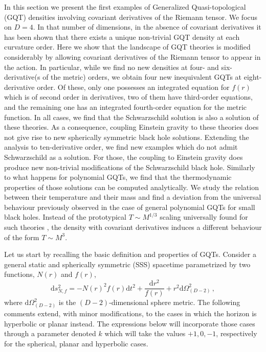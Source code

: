 \documentclass[11pt]{article}
\newcommand{\diff}{\mathrm{d}}
\newcommand{\comment}[1]{{\bf [[[#1]]]}}
\begin{document}
{In this section we present the first examples of Generalized Quasi-topological (GQT) densities involving covariant derivatives of the Riemann tensor. We focus on $D=4$. In that number of dimensions, in the absence of covariant derivatives it has been shown that there exists a unique non-trivial GQT density at each curvature order. Here we show that the landscape of GQT theories is modified considerably by allowing covariant derivatives of the Riemann tensor to appear in the action. In particular, while we find no new densities at four- and six-derivative(s of the metric) orders, we obtain four new inequivalent GQTs at eight-derivative order. Of these, only one possesses an integrated equation for $f(r)$ which is of second order in derivatives, two of them have third-order equations, and the remaining one has an integrated fourth-order equation for the metric function. In all cases, we find that the Schwarzschild solution is also a solution of these theories. As a consequence, coupling Einstein gravity to these theories does not give rise to new spherically symmetric black hole solutions. Extending the analysis to ten-derivative order, we find new examples which do not  admit  Schwarzschild as a solution. For those, the coupling to Einstein gravity does produce new non-trivial modifications of the Schwarzschild black hole. Similarly to what happens for polynomial GQTs, we find that the thermodynamic properties of those solutions can be computed analytically. We study the relation between their temperature and their mass and find a deviation from the universal behaviour previously observed in the case of general polynomial GQTs for small black holes. Instead of the prototypical $T\sim M^{1/3}$ scaling universally found for such theories \cite{PabloPablo4, Bueno:2019ycr}, the density with covariant derivatives induces a different behaviour of the form $T\sim M^3$. 



Let us start by recalling the basic definition and properties of GQTs. 
Consider a general static and spherically symmetric (SSS) spacetime parametrized by two functions, 
$N(r)$ and $f(r)$,
\begin{equation}
\label{SSS}
\diff s^2_{N, f}=-  N(r)^2 f(r) \diff t^2+\frac{\diff  r^2}{f(r)}  + r^2\diff \Omega^2_{(D-2)}\, ,
\end{equation}
where $\diff \Omega^2_{(D-2)}$ is the  $(D-2)$-dimensional sphere metric. The following comments extend, with minor modifications, to the cases in which the horizon is  hyperbolic or planar instead. The expressions below will incorporate those cases through a parameter  denoted $k$ which will take the values $+1,0,-1$, respectively for the spherical, planar and hyperbolic cases.


}
\end{document}

